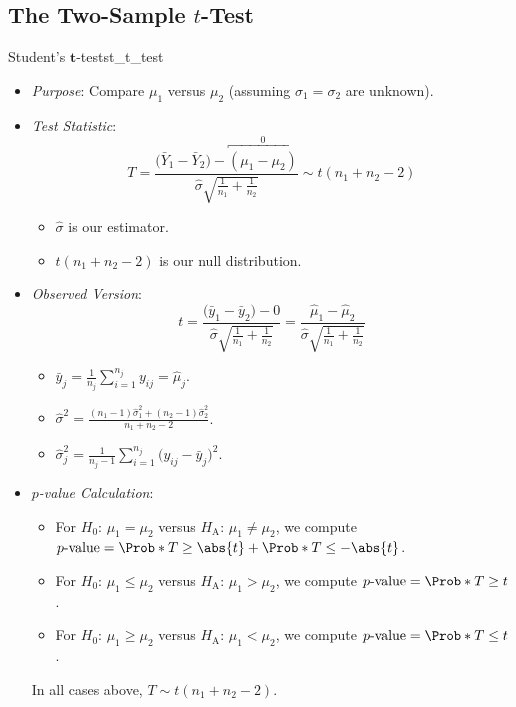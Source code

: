 \subsection{The Two-Sample \texorpdfstring{$ t $}{t}-Test}
\begin{Statistical_Test}{Student's $ \symbf{t} $-test}{st_t_test}
      \begin{itemize}
            \item \emph{Purpose}: Compare $ \mu_1 $ versus $ \mu_2 $ (assuming $ \sigma_1=\sigma_2 $ are unknown).
            \item \emph{Test Statistic}:
                  \[ T=\frac{\bigl(\bar{Y}_1-\bar{Y}_2\bigr)-\overbracket{(\mu_1-\mu_2)}^0}{\displaystyle \hat{\sigma}\sqrt{\frac{1}{n_1}+\frac{1}{n_2}}}\sim t(n_1+n_2-2) \]
                  \begin{itemize}
                        \item $ \hat{\sigma} $ is our estimator.
                        \item $ t(n_1+n_2-2) $ is our null distribution.
                  \end{itemize}
            \item \emph{Observed Version}:
                  \[ t=\frac{\bigl(\bar{y}_1-\bar{y}_2\bigr)-0}{\displaystyle \hat{\sigma}\sqrt{\frac{1}{n_1}+\frac{1}{n_2}}}
                        =\frac{\hat{\mu}_1-\hat{\mu}_2}{\displaystyle \hat{\sigma}\sqrt{\frac{1}{n_1}+\frac{1}{n_2}}} \]
                  \begin{itemize}
                        \item $ \displaystyle \bar{y}_j= \frac{1}{n_j}\sum_{i=1}^{n_j} y_{ij}=\hat{\mu}_j $.
                        \item $ \displaystyle \hat{\sigma}^2=\frac{(n_1-1)\hat{\sigma}_1^2+(n_2-1)\hat{\sigma}_2^2}{n_1+n_2-2} $.
                        \item $ \displaystyle \hat{\sigma}_j^2=\frac{1}{n_j-1} \sum_{i=1}^{n_j} \bigl(y_{ij}-\bar{y}_j\bigr)^2 $.
                  \end{itemize}
            \item \emph{$ p $-value Calculation}:
                  \begin{itemize}
                        \item For $ H_0 $: $ \mu_1=\mu_2 $ versus $ H_\text{A} $: $ \mu_1\ne\mu_2 $, we compute
                              $ p\text{-value}=\Prob*{T\ge \abs{t}}+\Prob*{T\le -\abs{t}} $.
                        \item For $ H_0 $: $ \mu_1\le\mu_2 $ versus $ H_\text{A} $: $ \mu_1>\mu_2 $, we compute
                              $ p\text{-value}=\Prob*{T\ge t} $.
                        \item For $ H_0 $: $ \mu_1\ge\mu_2 $ versus $ H_\text{A} $: $ \mu_1<\mu_2 $, we compute
                              $ p\text{-value}=\Prob*{T\le t} $.
                  \end{itemize}
                  \begin{Remark}{}{}
                        In all cases above, $ T \sim t(n_1+n_2-2) $.
                  \end{Remark}
      \end{itemize}
\end{Statistical_Test}
